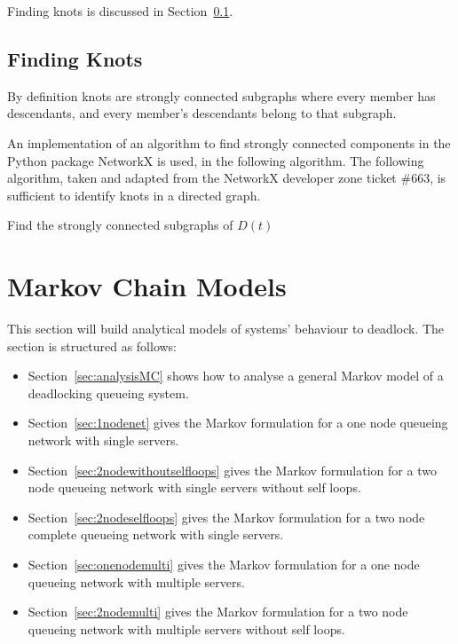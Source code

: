 \documentclass{article}
\begin{document}
Finding knots is discussed in Section~\ref{sec:findknots}.

\subsection{Finding Knots}\label{sec:findknots}

By definition knots are strongly connected subgraphs where every member has descendants, and every member's descendants belong to that subgraph.

An implementation of an algorithm to find strongly connected components in the Python package NetworkX is used, in the following algorithm.
The following algorithm, taken and adapted from the NetworkX developer zone ticket \#663, is sufficient to identify knots in a directed graph.

\begin{algorithm}[H]
    \DontPrintSemicolon
    Find the strongly connected subgraphs of $D(t)$\;
    \;
\end{algorithm}



\section{Markov Chain Models}\label{sec:markovmodels}

This section will build analytical models of systems' behaviour to deadlock.
The section is structured as follows:
\begin{itemize}
  \item Section~\ref{sec:analysisMC} shows how to analyse a general Markov model of a deadlocking queueing system.
  \item Section~\ref{sec:1nodenet} gives the Markov formulation for a one node queueing network with single servers.
  \item Section~\ref{sec:2nodewithoutselfloops} gives the Markov formulation for a two node queueing network with single servers without self loops.
  \item Section~\ref{sec:2nodeselfloops} gives the Markov formulation for a two node complete queueing network with single servers.
  \item Section~\ref{sec:onenodemulti} gives the Markov formulation for a one node queueing network with multiple servers.
  \item Section~\ref{sec:2nodemulti} gives the Markov formulation for a two node queueing network with multiple servers without self loops.
\end{itemize}
\end{document}
